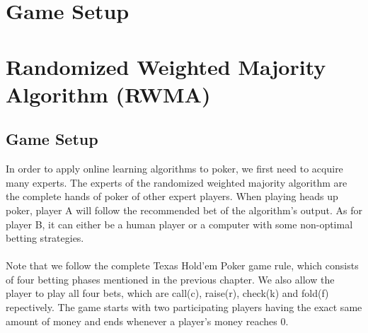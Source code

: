 \documentclass[12pt]{article}
\begin{document}
\section{Game Setup}


\section{Randomized Weighted Majority Algorithm (RWMA)}
\subsection{Game Setup}
In order to apply online learning algorithms to poker, we first need to acquire many experts. The experts of the randomized weighted majority algorithm are the complete hands of poker of other expert players. When playing heads up poker, player A will follow the recommended bet of the algorithm's output. As for player B, it can either be a human player or a computer with some non-optimal betting strategies. \\
\\
Note that we follow the complete Texas Hold'em Poker game rule, which consists of four betting phases mentioned in the previous chapter. We also allow the player to play all four bets, which are call(c), raise(r), check(k) and fold(f) repectively. The game starts with two participating players having the exact same amount of money and ends whenever a player's money reaches 0.
\end{document}
